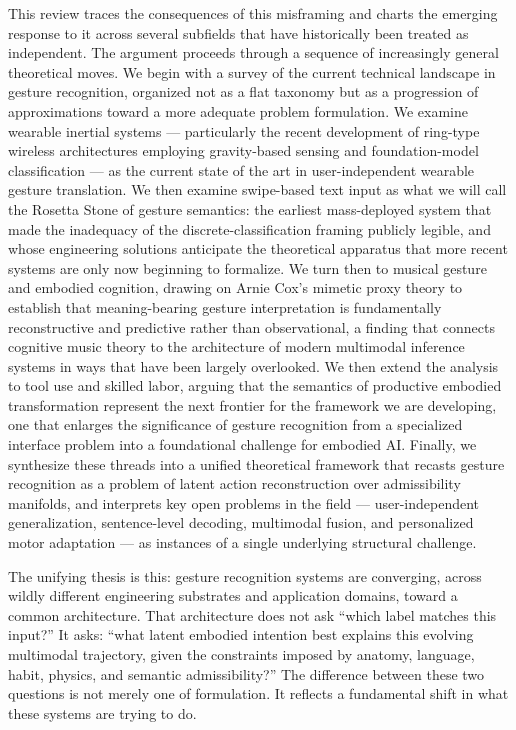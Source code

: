 \documentclass[11pt, a4paper]{article}
\theoremstyle{definition}
\begin{document}
This review traces the consequences of this misframing and charts the emerging response to it across several subfields that have historically been treated as independent. The argument proceeds through a sequence of increasingly general theoretical moves. We begin with a survey of the current technical landscape in gesture recognition, organized not as a flat taxonomy but as a progression of approximations toward a more adequate problem formulation. We examine wearable inertial systems --- particularly the recent development of ring-type wireless architectures employing gravity-based sensing and foundation-model classification \cite{park2026} --- as the current state of the art in user-independent wearable gesture translation. We then examine swipe-based text input as what we will call the Rosetta Stone of gesture semantics: the earliest mass-deployed system that made the inadequacy of the discrete-classification framing publicly legible, and whose engineering solutions anticipate the theoretical apparatus that more recent systems are only now beginning to formalize. We turn then to musical gesture and embodied cognition, drawing on Arnie Cox's mimetic proxy theory \cite{cox2016} to establish that meaning-bearing gesture interpretation is fundamentally reconstructive and predictive rather than observational, a finding that connects cognitive music theory to the architecture of modern multimodal inference systems in ways that have been largely overlooked. We then extend the analysis to tool use and skilled labor, arguing that the semantics of productive embodied transformation represent the next frontier for the framework we are developing, one that enlarges the significance of gesture recognition from a specialized interface problem into a foundational challenge for embodied AI. Finally, we synthesize these threads into a unified theoretical framework that recasts gesture recognition as a problem of latent action reconstruction over admissibility manifolds, and interprets key open problems in the field --- user-independent generalization, sentence-level decoding, multimodal fusion, and personalized motor adaptation --- as instances of a single underlying structural challenge.

The unifying thesis is this: gesture recognition systems are converging, across wildly different engineering substrates and application domains, toward a common architecture. That architecture does not ask ``which label matches this input?'' It asks: ``what latent embodied intention best explains this evolving multimodal trajectory, given the constraints imposed by anatomy, language, habit, physics, and semantic admissibility?'' The difference between these two questions is not merely one of formulation. It reflects a fundamental shift in what these systems are trying to do.
\end{document}
